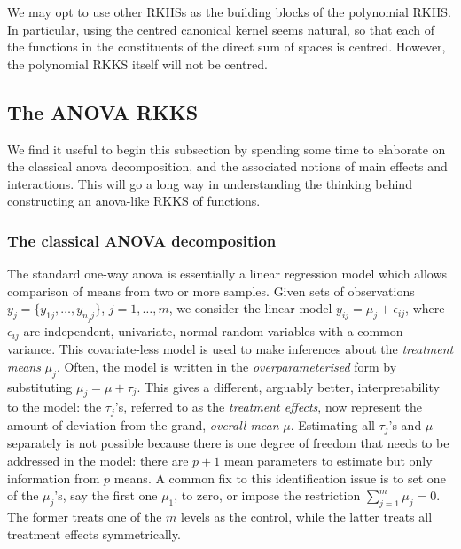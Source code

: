 \begin{remark}
  We may opt to use other RKHSs as the building blocks of the polynomial RKHS.
  In particular, using the centred canonical kernel seems natural, so that each of the functions in the constituents of the direct sum of spaces is centred.
  However, the polynomial RKKS itself will not be centred.
\end{remark}

\subsection{The ANOVA RKKS}
\label{sec:anovarkks}

We find it useful to begin this subsection by spending some time to elaborate on the classical \gls*{anova} decomposition, and the associated notions of main effects and interactions.
This will go a long way in understanding the thinking behind constructing an \gls*{anova}-like RKKS of functions.

\subsubsection{The classical ANOVA decomposition}

The standard one-way \gls*{anova} is essentially a linear regression model which allows comparison of means from two or more samples.
Given sets of observations $y_j = \{y_{1j},\dots,y_{n_jj}\}$, $j=1,\dots,m$, we consider the linear model $y_{ij} = \mu_j + \epsilon_{ij}$, where $\epsilon_{ij}$ are independent, univariate, normal random variables with a common variance.
This covariate-less model is used to make inferences about the  \emph{treatment means} $\mu_j$.
Often, the model is written in the \emph{overparameterised} form by substituting $\mu_j = \mu + \tau_j$.
This gives a different, arguably better, interpretability to the model: the $\tau_j$'s, referred to as the \emph{treatment effects}, now represent the amount of deviation from the grand, \emph{overall mean} $\mu$.
Estimating all $\tau_j$'s and $\mu$ separately is not possible because there is one degree of freedom that needs to be addressed in the model: there are $p+1$ mean parameters to estimate but only information from $p$ means.
A common fix to this identification issue is to set one of the $\mu_j$'s, say the first one $\mu_1$, to zero, or impose the restriction $\sum_{j=1}^m \mu_j = 0$.
The former treats one of the $m$ levels as the control, while the latter treats all treatment effects symmetrically.

